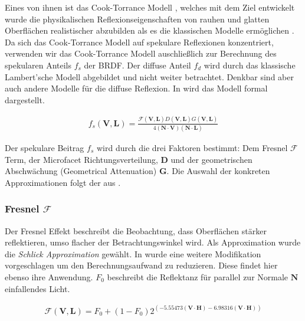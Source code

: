Eines von ihnen ist das Cook-Torrance Modell \parencite{Cook1981}, welches mit dem Ziel entwickelt wurde die physikalischen Reflexionseigenschaften von rauhen und glatten Oberflächen realistischer abzubilden als es die klassischen Modelle ermöglichen \parencite[Seite 40]{Ngan2004}. Da sich das Cook-Torrance Modell auf spekulare Reflexionen konzentriert, verwenden wir das Cook-Torrance Modell auschließlich zur Berechnung des spekularen Anteils $f_s$ der BRDF. Der diffuse Anteil $f_d$ wird durch das klassische Lambert'sche Modell abgebildet und nicht weiter betrachtet. Denkbar sind aber auch andere Modelle für die diffuse Reflexion. In  wird das Modell formal dargestellt.

\begin{align}
	\label{eq:cook-torrance-model}
	f_s(\mathbf V,\mathbf L) = \frac{\mathcal{F}(\mathbf V,\mathbf L)D(\mathbf V,\mathbf L)G(\mathbf V,\mathbf L)}{4(\mathbf N \cdot \mathbf V)(\mathbf N \cdot \mathbf L)}
\end{align}

Der spekulare Beitrag $f_s$ wird durch die drei Faktoren bestimmt: Dem Fresnel $\mathcal{F}$ Term, der Microfacet Richtungsverteilung, $\mathbf D$ und der geometrischen Abschwächung (Geometrical Attenuation) $\mathbf G$. Die Auswahl der konkreten Approximationen folgt der aus \cite[Seite 3]{Karis2013}.

\subsubsection[Fresnel]{Fresnel $\mathcal{F}$}
Der Fresnel Effekt beschreibt die Beobachtung, dass Oberflächen stärker reflektieren, umso flacher der Betrachtungswinkel wird. Als Approximation wurde die \textit{Schlick Approximation} \parencite{Schlick1994} gewählt. In \cite{Lagarde2012} wurde eine weitere Modifikation vorgeschlagen um den Berechnungsaufwand zu reduzieren. Diese findet hier ebenso ihre Anwendung. $F_0$ beschreibt die Reflektanz für parallel zur Normale $\mathbf N$ einfallendes Licht.

\begin{align}
	\label{eq:fresnel-schlick}
	\mathcal F(\mathbf V,\mathbf L) = F_0  + (1 - F_0) 2^{(-5.55473 (\mathbf V \cdot \mathbf H) - 6.98316 (\mathbf V \cdot \mathbf H))}
\end{align}


